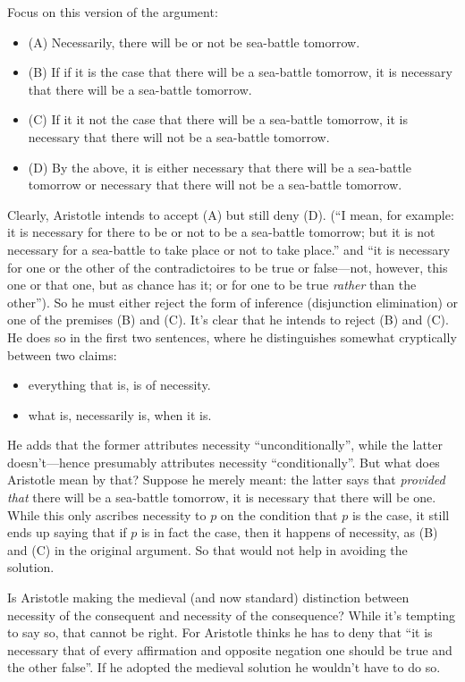\documentclass[../../../include/open-logic-section]{subfiles}
\begin{document}
Focus on this version of the argument:

\begin{itemize}
	\item (A) Necessarily, there will be or not be sea-battle tomorrow.  
	\item (B) If if it is the case that there will be a sea-battle tomorrow, it is necessary that there will be a sea-battle tomorrow. 
	\item (C) If it it not the case that there will be a sea-battle tomorrow, it is necessary that there will not be a sea-battle tomorrow.
	\item (D) By the above, it is either necessary that there will be a sea-battle tomorrow or necessary that there will not be a sea-battle tomorrow.
\end{itemize}

Clearly, Aristotle intends to accept (A) but still deny (D). (``I mean, for  example: it is necessary for there to be or not to be a sea-battle tomorrow; but it is not necessary for a sea-battle to take place or not to take place.'' and ``it is necessary for one or the other of the contradictoires to be true or false---not, however, this one or that one, but as chance has it; or for one to be true \emph{rather} than the other''). So he must either reject the form of inference (disjunction elimination) or one of the premises (B) and (C). It's clear that he intends to reject (B) and (C). He does so in the first two sentences, where he distinguishes somewhat cryptically between two claims:

\begin{itemize}
  	\item everything that is, is of necessity.
  	\item what is, necessarily is, when it is. 
\end{itemize}

He adds that the former attributes necessity ``unconditionally'', while the latter doesn't---hence presumably attributes necessity ``conditionally''. But what does Aristotle mean by that? Suppose he merely meant: the latter says that \emph{provided that} there will be a sea-battle tomorrow, it is necessary that there will be one. While this only ascribes necessity to $p$ on the condition that $p$ is the case, it still ends up saying that if $p$ is in fact the case, then it happens of necessity, as (B) and (C) in the original argument. So that would not help in avoiding the solution. 

Is Aristotle making the medieval (and now standard) distinction between necessity of the consequent and necessity of the consequence? While it's tempting to say so, that cannot be right. For Aristotle thinks he has to deny that ``it is necessary that of every affirmation and opposite negation one should be true and the other false''. If he adopted the medieval solution he wouldn't have to do so.
\end{document}
